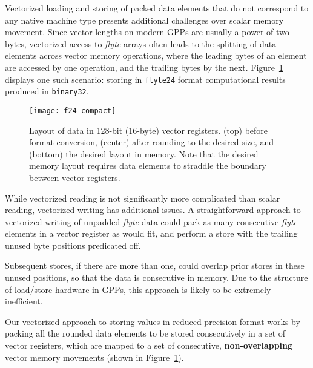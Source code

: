 \documentclass{sig-alternate-05-2015}
\newcommand{\mt}[1]{\texttt{#1}}
\begin{document}
Vectorized loading and storing of packed data elements that do not correspond
to any native machine type presents additional challenges over scalar memory
movement. Since vector lengths on modern GPPs are usually a power-of-two bytes,
vectorized access to \textit{flyte} arrays often leads to the splitting of data
elements across vector memory operations, where the leading bytes of an element
are accessed by one operation, and the trailing bytes by the next.
Figure~\ref{fig:f24} displays one such scenario: storing in \mt{flyte24} format
computational results produced in \mt{binary32}.





\begin{figure}[ht]
\centering\texttt{[image: f24-compact]}

\caption{Layout of data in 128-bit (16-byte) vector registers. (top) before
format conversion, (center) after rounding to the desired size, and (bottom)
the desired layout in memory. Note that the desired memory layout requires data
elements to straddle the boundary between vector registers.}

\label{fig:f24}
\end{figure}

















\noindent While vectorized reading is not significantly more complicated than
scalar reading, vectorized writing has additional issues. A straightforward
approach to vectorized writing of unpadded \textit{flyte} data could pack as
many consecutive \textit{flyte} elements in a vector register as would fit, and
perform a store with the trailing unused byte positions predicated off.

Subsequent stores, if there are more than one, could overlap prior stores in
these unused positions, so that the data is consecutive in memory. Due
to the structure of load/store hardware in GPPs, this approach is likely to be
extremely inefficient.

Our vectorized approach to storing values in reduced precision format
works by packing all the rounded data elements to be stored consecutively in a
set of vector registers, which are mapped to a set of consecutive,
\textbf{non-overlapping} vector memory movements (shown in
Figure~\ref{fig:f24}).
\end{document}
